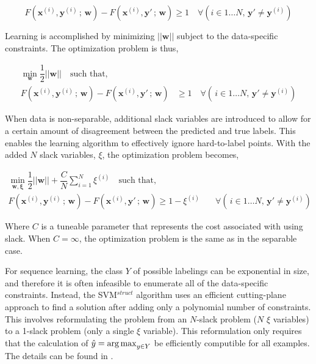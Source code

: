 \begin{equation*}
F(\mathbf{x}^{(i)}, \mathbf{y}^{(i)}\,;\,\mathbf{w}) -
F(\mathbf{x}^{(i)}, \mathbf{y}'\,;\,\mathbf{w}) \geq 1 \quad
\forall \left(i \in 1\dots N,\,\mathbf{y}' \neq \mathbf{y}^{(i)}\right)
\end{equation*}

Learning is accomplished by minimizing $||\mathbf{w}||$ subject to the
data-specific constraints. The optimization problem is thus,

\begin{align*}
\min_{\mathbf{w}}\dfrac{1}{2}||\mathbf{w}||\quad\text{such that,}&\\
F(\mathbf{x}^{(i)}, \mathbf{y}^{(i)}\,;\,\mathbf{w}) -
F(\mathbf{x}^{(i)}, \mathbf{y}'\,;\,\mathbf{w}) &\geq 1 \quad
\forall \left(\, i \in 1\dots N, \,\mathbf{y}' \neq \mathbf{y}^{(i)}\right)
\end{align*}

When data is non-separable, additional slack variables are introduced to allow
for a certain amount of disagreement between the predicted and true labels.
  This enables the learning algorithm to effectively ignore hard-to-label
  points. With the added $N$ slack variables, $\xi$, the optimization problem
  becomes,

\begin{align*}
\min_{\mathbf{w, \xi}}\dfrac{1}{2}||\mathbf{w}|| +
\dfrac{C}{N}\sum_{i=1}^{N}\xi^{(i)}
\quad\text{such that,}&\\
F(\mathbf{x}^{(i)}, \mathbf{y}^{(i)}\,;\,\mathbf{w}) -
F(\mathbf{x}^{(i)}, \mathbf{y}'\,;\,\mathbf{w}) \geq 1 - \xi^{(i)} &\quad
\forall \left(\, i \in 1\dots N, \,\mathbf{y}' \neq \mathbf{y}^{(i)}\right)
\end{align*}

Where $C$ is a tuneable parameter that represents the cost associated with
using slack. When $C = \infty$, the optimization problem is the same as in
the separable case.

For sequence learning, the class $Y$ of possible labelings can be exponential
in size, and therefore it is often infeasible to enumerate all of the
data-specific constraints. Instead, the SVM$^{struct}$ algorithm uses an
efficient cutting-plane approach to find a solution after adding only a
polynomial number of constraints. This involves reformulating the problem from
an $N$-slack problem ($N$ $\xi$ variables) to a 1-slack problem (only a single
$\xi$ variable). This reformulation only requires that the calculation of
$\hat{y} = \operatorname*{arg\,max}_{y \in Y}$ be efficiently computible for all examples. The
details can be found in \cite{Joachims_cuttingplane}.

